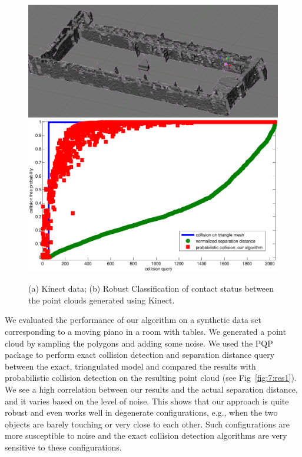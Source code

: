 \begin{figure}[htb]
  \centering
  \includegraphics[width=0.79\linewidth]{figs/7/kinect.png}
  \includegraphics[width=0.79\linewidth]{figs/7/kinect.pdf}
  \caption[Comparison between the results for $100$ random queries between prior collision detection algorithms for exact triangle meshes and our
  algorithm on the Kinect data]{\label{fig:7:res3} (a) Kinect data; (b) Robust Classification of contact status between the point clouds generated using Kinect.}
\end{figure}



We evaluated the performance of our algorithm on a synthetic data set corresponding to a moving piano in a room with tables.
We generated a point cloud by sampling the polygons and adding some noise. We used the PQP package to perform exact collision detection and separation
distance query between the exact, triangulated model and compared the results with probabilistic collision detection on the resulting point cloud (see Fig~\ref{fig:7:res1}). We see a high correlation between our results and the actual separation distance, and it varies based on the level of noise.
This shows that our approach is quite robust and even works well in degenerate configurations, e.g., when the two objects are barely touching or very close to each other. Such configurations are more susceptible to noise and the exact collision detection algorithms are very sensitive to these configurations.


